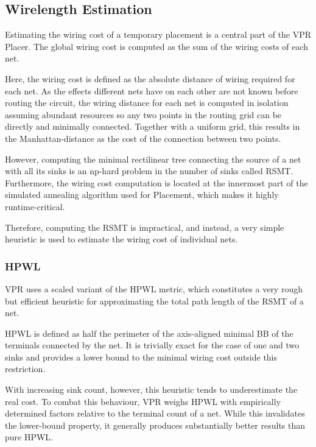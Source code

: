 \subsection{Wirelength Estimation}

Estimating the wiring cost of a temporary placement is a central part of the \gls{VPR} Placer. The global wiring cost is computed as the sum of the wiring costs of each net.

Here, the wiring cost is defined as the absolute distance of wiring required for each net. As the effects different nets have on each other are not known before routing the circuit, the wiring distance for each net is computed in isolation assuming abundant resources so any two points in the routing grid can be directly and minimally connected. Together with a uniform grid, this results in the Manhattan-distance as the cost of the connection between two points.

However, computing the minimal rectilinear tree connecting the source of a net with all its sinks is an np-hard problem in the number of sinks called \gls{RSMT}.\cite{rsmt-complexity} Furthermore, the wiring cost computation is located at the innermost part of the simulated annealing algorithm used for Placement, which makes it highly runtime-critical.

Therefore, computing the \gls{RSMT} is impractical, and instead, a very simple heuristic is used to estimate the wiring cost of individual nets.

\subsubsection{\gls{HPWL}}

\gls{VPR} uses a scaled variant of the \gls{HPWL} metric, which constitutes a very rough but efficient heuristic for approximating the total path length of the \gls{RSMT} of a net.

\gls{HPWL} is defined as half the perimeter of the axis-aligned minimal \gls{BB} of the terminals connected by the net. It is trivially exact for the case of one and two sinks and provides a lower bound to the minimal wiring cost outside this restriction. 

With increasing sink count, however, this heuristic tends to underestimate the real cost. To combat this behaviour, \gls{VPR} weighs \gls{HPWL} with empirically determined factors relative to the terminal count of a net. While this invalidates the lower-bound property, it generally produces substantially better results than pure \gls{HPWL}.

